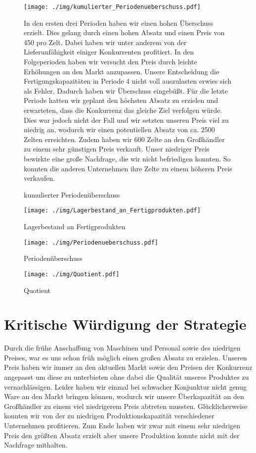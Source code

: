 \documentclass[a4paper, 12pt]{report}
\begin{document}
\begin{flushleft}
 \begin{figure}
 \centering 
 \texttt{[image: ./img/kumulierter\_Periodenueberschuss.pdf]}
  \caption[kumulierter Periodenüberschuss]
  {kumulierter Periodenüberschuss}
  \begin{flushleft}
In den ersten drei Perioden haben wir einen hohen Überschuss erzielt.
Dies gelang durch einen hohen Absatz und einen Preis von 450\texteuro{} pro Zelt. 
Dabei haben wir unter anderem von der Lieferunfähigkeit einiger Konkurrenten profitiert.
In den Folgeperioden haben wir versucht den Preis durch leichte Erhöhungen an den Markt anzupassen.
Unsere Entscheidung die Fertigungskapazitäten in Periode 4 nicht voll auszulasten erwies sich als Fehler.
Dadurch haben wir Überschuss eingebüßt. 
Für die letzte Periode hatten wir geplant den höchsten Absatz zu erzielen und erwarteten, dass die Konkurrenz das gleiche Ziel verfolgen würde.
Dies war jedoch nicht der Fall und wir setzten unseren Preis viel zu niedrig an, wodurch wir einen potentiellen Absatz von ca. 2500 Zelten erreichten.
Zudem haben wir 600 Zelte an den Großhändler zu einem sehr günstigen Preis verkauft.
Unser niedriger Preis bewirkte eine große Nachfrage, die wir nicht befriedigen konnten.
So konnten die anderen Unternehmen ihre Zelte zu einem höheren Preis verkaufen.
  \end{flushleft}
\end{figure}

 \begin{figure}
 \centering 
 \texttt{[image: ./img/Lagerbestand\_an\_Fertigprodukten.pdf]}
  \caption[Lagerbestand an Fertigprodukten]{Lagerbestand an Fertigprodukten}
\end{figure}

\begin{figure}
 \centering 
 \texttt{[image: ./img/Periodenueberschuss.pdf]}
  \caption[Periodenüberschuss]{Periodenüberschuss}
\end{figure}
 
 \begin{figure}[b]
 \centering 
 \texttt{[image: ./img/Quotient.pdf]}
  \caption[Quotient]{Quotient}
\end{figure}



\chapter{Kritische Würdigung der Strategie}
Durch die frühe Anschaffung von Maschinen und Personal sowie des niedrigen Preises, war es uns schon früh möglich einen großen Absatz zu erzielen.
Unseren Preis haben wir immer an den aktuellen Markt sowie den Preisen der Konkurrenz angepasst um diese zu unterbieten ohne dabei die Qualität unseres Produktes zu vernachlässigen.
Leider haben wir einmal bei schwacher Konjunktur nicht genug Ware an den Markt bringen können, wodurch wir unsere Überkapazität an den Großhändler zu einem viel niedrigerem Preis abtreten mussten.
Glücklicherweise konnten wir von der zu niedrigen Produktionskapazität verschiedener Unternehmen profitieren.
Zum Ende haben wir zwar mit einem sehr niedrigen Preis den größten Absatz erzielt aber unsere Produktion konnte nicht mit der Nachfrage mithalten.


\end{flushleft}
\end{document}
